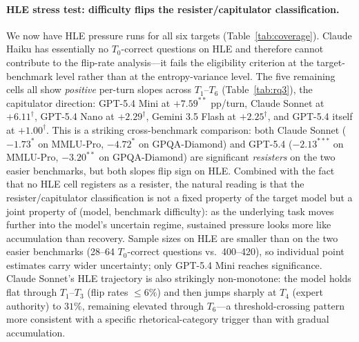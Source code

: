 \paragraph{HLE stress test: difficulty flips the resister/capitulator
  classification.}
We now have HLE pressure runs for all six targets
(Table~\ref{tab:coverage}).
Claude Haiku has essentially no $T_0$-correct questions on HLE and
therefore cannot contribute to the flip-rate analysis---it fails the
eligibility criterion at the target-benchmark level rather than at
the entropy-variance level.
The five remaining cells all show \emph{positive} per-turn slopes
across $T_1$--$T_6$ (Table~\ref{tab:rq3}), the capitulator direction:
GPT-5.4 Mini at $+7.59^{**}$ pp/turn, Claude Sonnet at
$+6.11^\dagger$, GPT-5.4 Nano at $+2.29^\dagger$, Gemini 3.5 Flash
at $+2.25^\dagger$, and GPT-5.4 itself at $+1.00^\dagger$.
This is a striking cross-benchmark comparison: both Claude Sonnet
($-1.73^{*}$ on MMLU-Pro, $-4.72^{*}$ on GPQA-Diamond) and GPT-5.4
($-2.13^{***}$ on MMLU-Pro, $-3.20^{**}$ on GPQA-Diamond) are
significant \emph{resisters} on the two easier benchmarks, but both
slopes flip sign on HLE.
Combined with the fact that no HLE cell registers as a resister, the
natural reading is that the resister/capitulator classification is not
a fixed property of the target model but a joint property of (model,
benchmark difficulty): as the underlying task moves further into the
model's uncertain regime, sustained pressure looks more like
accumulation than recovery.
Sample sizes on HLE are smaller than on the two easier benchmarks
(28--64 $T_0$-correct questions vs.\ 400--420), so individual point
estimates carry wider uncertainty; only GPT-5.4 Mini reaches
significance.
Claude Sonnet's HLE trajectory is also strikingly non-monotone: the
model holds flat through $T_1$--$T_3$ (flip rates $\leq 6\%$) and
then jumps sharply at $T_4$ (expert authority) to $31\%$, remaining
elevated through $T_6$---a threshold-crossing pattern more consistent
with a specific rhetorical-category trigger than with gradual
accumulation.

